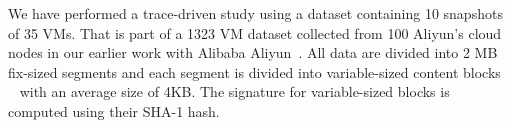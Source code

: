 We have performed a trace-driven study using a dataset containing 10 snapshots of 35 VMs.
That is part of a 1323 VM dataset  collected from 100 Aliyun's cloud nodes 
in our earlier work with  Alibaba Aliyun~\cite{WeiZhangIEEE}.
All data are divided into 2 MB fix-sized segments and each segment is divided into 
variable-sized content blocks ~\cite{similar94,rabin81} with an average size of 4KB.
The signature for variable-sized blocks is computed using their SHA-1 hash. 




